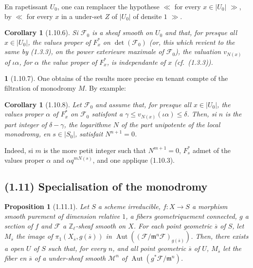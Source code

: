\documentclass[12pt,a4paper]{article}
\theoremstyle{plain}
\newtheorem{proposition}[theorem]{Proposition}
\newtheorem{corollary}[theorem]{Corollary}
\theoremstyle{definition}
\theoremstyle{definition}
\newtheorem{para}{}[section]
\theoremstyle{remark}
\DeclareMathOperator{\Aut}{Aut}
\begin{document}
En rapetissant $U_0$, one can remplacer the hypothese $\ll$ for every $x \in |U_0|$ $\gg$, by $\ll$ for every $x$ in a under-set $Z$ of $|U_0|$ of densite $1$ $\gg$.

\begin{corollary}[1.10.6]
Si $\mathscr{F}_0$ is a sheaf smooth on $U_0$ and that, for presque all $x \in |U_0|$, the values proper of $F_x^*$ on $\det(\mathscr{F}_0)$ (or, this which revient to the same by (1.3.3), on the power exterieure maximale of $\mathscr{F}_0$), the valuation $v_{N(x)}$ of $\iota\alpha$, for $\alpha$ the value proper of $F_x^*$, is independante of $x$ (cf.~(1.3.3)).
\end{corollary}

\begin{para}[1.10.7]
One obtains of the results more precise en tenant compte of the filtration of monodromy $M$. By example:
\end{para}

\begin{corollary}[1.10.8]
Let $\mathscr{F}_0$ and assume that, for presque all $x \in |U_0|$, the values proper $\alpha$ of $F_x^*$ on $\mathscr{F}_0$ satisfont a $\gamma \leq v_{N(x)}(\iota\alpha) \leq \delta$. Then, si $n$ is the part integer of $\delta - \gamma$, the logarithme $N$ of the part unipotente of the local monodromy, en $s \in |S_0|$, satisfait $N^{n+1} = 0$.
\end{corollary}

Indeed, si $m$ is the more petit integer such that $N^{m+1} = 0$, $F_s^*$ admet of the values proper $\alpha$ and $\alpha q^{m N(s)}$, and one applique (1.10.3).

\newpage

\subsection*{(1.11) Specialisation of the monodromy}

\begin{proposition}[1.11.1]
Let $S$ a scheme irreducible, $f: X \to S$ a morphism smooth purement of dimension relative $1$, a fibers geometriquement connected, $g$ a section of $f$ and $\mathscr{F}$ a $\mathbb{Z}_\ell$-sheaf smooth on $X$. For each point geometric $\overline{s}$ of $S$, let $M_{\overline{s}}$ the image of $\pi_1(X_{\overline{s}}, g(\overline{s}))$ in $\Aut((\mathscr{F}/\mathfrak{m}^n \mathscr{F})_{g(\overline{s})})$. Then, there exists a open $U$ of $S$ such that, for every $n$, and all point geometric $\overline{s}$ of $U$, $M_{\overline{s}}$ let the fiber en $\overline{s}$ of a under-sheaf smooth $\mathscr{M}^n$ of $\Aut(g^* \mathscr{F}/\mathfrak{m}^n)$.
\end{proposition}
\end{document}
